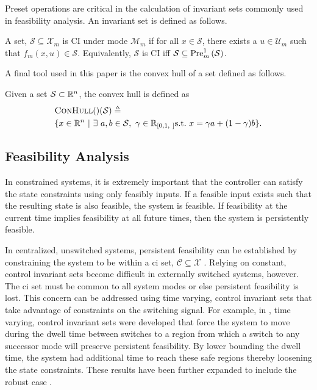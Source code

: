 Preset operations are critical in the calculation of invariant sets commonly used in feasibility analysis. An invariant set is defined as follows.
\begin{definition}\label{def:ci_set}
A set, $\mathcal{S}\subseteq\mathcal{X}_m$ is CI under mode $\mathcal{M}_m$ if for all $x\in\mathcal{S}$, there exists a $u\in\mathcal{U}_m$ such that $f_m(x,u)\in\mathcal{S}$. Equivalently, $\mathcal{S}$ is CI iff $\mathcal{S}\subseteq\Pre[m][1]{\mathcal{S}}$.
\end{definition}

A final tool used in this paper is the convex hull of a set defined as follows.
\begin{definition}
Given a set $\mathcal{S}\subset\mathbb{R}^n$, the convex hull is defined as 
\begin{align*}
&\Call{ConHull}\left(\mathcal{S}\right)\triangleq\\&\{x\in\real^n\ |\ \exists\ a,b\in\mathcal{S},\ \gamma\in\real\rii{0,1}\ \text{s.t.}\ x=\gamma a + (1-\gamma)b\}.
\end{align*}
\end{definition}
\subsection{Feasibility Analysis}
In constrained systems, it is extremely important that the controller can satisfy the state constraints using only feasibly inputs. If a feasible input exists such that the resulting state is also feasible, the system is feasible. If feasibility at the current time implies feasibility at all future times, then the system is persistently feasible.

In centralized, unswitched systems, persistent feasibility can be established by constraining the system to be within a \ac{ci} set, $\mathcal{C}\subseteq\mathcal{X}$ \cite{Blanchini1999}. Relying on constant, control invariant sets become difficult in externally switched systems, however. The \ac{ci} set must be common to all system modes or else persistent feasibility is lost. This concern can be addressed using time varying, control invariant sets that take advantage of constraints on the switching signal. For example, in \cite{Danielson2019,Santis2004}, time varying, control invariant sets were developed that force the system to move during the dwell time between switches to a region from which a switch to any successor mode will preserve persistent feasibility. By lower bounding the dwell time, the system had additional time to reach these safe regions thereby loosening the state constraints. These results have been further expanded to include the robust case \cite{Lavaei2021}.

